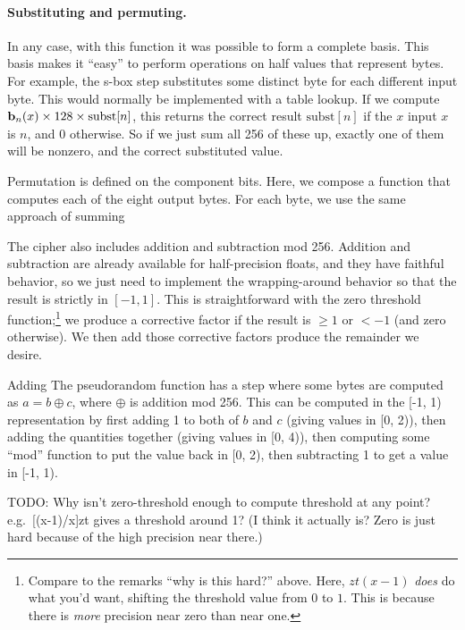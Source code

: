 \documentclass[twocolumn]{article}
\newcommand\basis{\ensuremath{\textrm{\bf b}}}
\begin{document}
\paragraph{Substituting and permuting.}
In any case, with this function it was possible to form a complete basis. This basis
makes it ``easy'' to perform operations on half values that represent bytes. For
example, the s-box step substitutes some distinct byte for each different input
byte. This would normally be implemented with a table lookup. If we compute
$\basis_n(x) \times 128 \times \mathrm{subst}[n]$, this returns the correct
result $\mathrm{subst}[n]$ if the $x$ input $x$ is $n$, and $0$ otherwise.
So if we just sum all 256 of these up, exactly one of them will be nonzero,
and the correct substituted value.

Permutation is defined on the component bits. Here, we compose a function that
computes each of the eight output bytes. For each byte, we use the same approach
of summing

The cipher also includes addition and subtraction mod 256. Addition
and subtraction are already available for half-precision floats, and
they have faithful behavior, so we just need to implement the wrapping-around
behavior so that the result is strictly in $[-1, 1]$.
This is straightforward with the zero threshold function;\footnote{Compare to
  the remarks ``why is this hard?'' above. Here, $zt(x - 1)$ {\em does} do what you'd want,
  shifting the threshold value from $0$ to $1$. This is because there is {\em more}
  precision near zero than near one.}
we produce a corrective factor if the result is $\geq 1$ or $< -1$ (and zero otherwise).
We then add those corrective factors produce the remainder we desire.

%
%
Adding
The pseudorandom function has a step where some bytes are computed as $a = b \oplus c$, where $\oplus$ is addition mod 256. This can be computed in the [-1, 1) representation by first
adding 1 to both of $b$ and $c$ (giving values in [0, 2)), then adding the quantities together (giving values in [0, 4)), then computing some ``mod'' function to put the value back in [0, 2), then subtracting 1 to get a value in [-1, 1).

TODO: Why isn't zero-threshold enough to compute threshold at any point? e.g.~[(x-1)/x]zt gives a threshold around 1?
(I think it actually is? Zero is just hard because of the high precision near there.)
\end{document}
